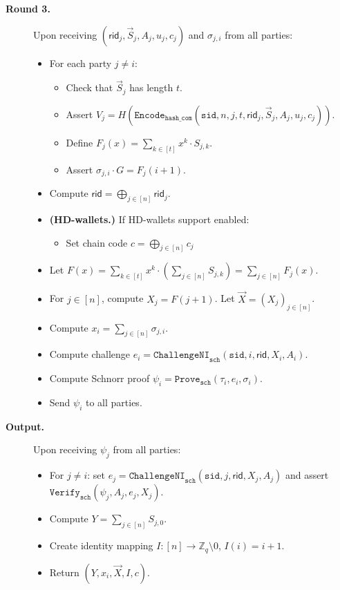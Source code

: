 \documentclass[11pt]{article}
\newcommand{\sid}{\ensuremath{\mathtt{sid}}}
\newcommand{\challengeni}[1]{\ensuremath{\mathtt{ChallengeNI}_{\mathtt{#1}}}}
\newcommand{\prove}[1]{\ensuremath{\mathtt{Prove}_{\mathtt{#1}}}}
\newcommand{\verify}[1]{\ensuremath{\mathtt{Verify}_{\mathtt{#1}}}}
\newcommand{\Encode}[1]{\ensuremath{\mathtt{Encode}_{\mathtt{#1}}}}
\newcommand{\rid}{\textsf{rid}}
\newcommand{\Z}{\mathbb{Z}}
\newcommand{\?}[1]{\stackrel{?}{#1}}
\begin{document}
\begin{description}
  \item[\textbf{Round 3.}] 
    Upon receiving $(\rid_j, \vec{S}_j, A_j, u_j, c_j)$ and $\sigma_{j,i}$ from all parties:
    \begin{itemize}
      \item For each party $j \neq i$:
        \begin{itemize}
        \item Check that $\vec{S}_j$ has length $t$.
        \item Assert $V_j = H(\Encode{hash\_com}(\sid, n, j, t, \rid_j, \vec{S}_j, A_j, u_j, c_j))$.
        \item Define 
          $F_j(x) = \sum_{k \in [t]} x^k \cdot S_{j,k}$.
        \item Assert $\sigma_{j,i} \cdot G  = F_j(i + 1)$.
        \end{itemize}
        \item Compute $\rid = \bigoplus_{j \in [n]} \rid_j$.
        \item {\bf (HD-wallets.)} If HD-wallets support enabled:
        \begin{itemize}
          \item Set chain code $c = \bigoplus_{j \in [n]} c_j$
        \end{itemize}
        \item Let $F(x) = \sum_{k \in [t]} x^k \cdot \left(\sum_{j\in [n]} S_{j,k}\right) = \sum_{j \in [n]} F_j(x)$. 
        \item   For $j \in [n]$, compute
            $X_j = F(j + 1)$. 
            Let $\vec{X} = (X_j)_{j \in [n]}$.
      \item Compute $x_i = \sum_{j \in [n]} \sigma_{j,i}$.
      \item Compute challenge $e_i = \challengeni{sch}(\sid, i, \rid, X_i, A_i)$.
      \item Compute Schnorr proof $\psi_i = \prove{sch}(\tau_i, e_i, \sigma_i)$.
      \item Send $\psi_i$ to all parties.
    \end{itemize}

  \item[\textbf{Output.}] 
  Upon receiving $\psi_j$ from all parties:
    \begin{itemize}
      \item For $j \neq i$:
      set $e_j = \challengeni{sch}(\sid, j, \rid, X_j, A_j)$ and 
      assert $\verify{sch}(\psi_j, A_j, e_j, X_j)$.
      \item Compute $Y = \sum_{j \in [n]} S_{j,0}$.
      \item Create identity mapping $I : [n] \to \Z_q \setminus 0$,
        $I(i) = i + 1$.
      \item Return $(Y, x_i, \vec{X}, I, c)$.
    \end{itemize}

\end{description}
\end{document}
